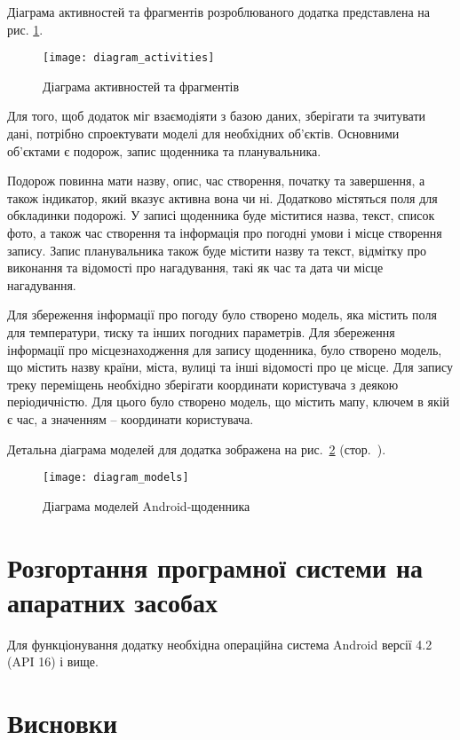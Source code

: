 \documentclass[../main.tex]{subfiles}
\begin{document}
Діаграма активностей та фрагментів розроблюваного додатка представлена на рис. \ref{diagram:activities}.

\begin{figure}[H]
	\centering
	\texttt{[image: diagram\_activities]}
	\caption{Діаграма активностей та фрагментів}
	\label{diagram:activities}
\end{figure}

Для того, щоб додаток міг взаємодіяти з базою даних, зберігати та зчитувати дані, потрібно спроектувати моделі для необхідних об'єктів. Основними об'єктами є подорож, запис щоденника та планувальника.

Подорож повинна мати назву, опис, час створення, початку та завершення, а також індикатор, який вказує активна вона чи ні. Додатково містяться поля для обкладинки подорожі. У записі щоденника буде міститися назва, текст, список фото, а також час створення та інформація про погодні умови і місце створення запису. Запис планувальника також буде містити назву та текст, відмітку про виконання та відомості про нагадування, такі як час та дата чи місце нагадування.

Для збереження інформації про погоду було створено модель, яка містить поля для температури, тиску та інших погодних параметрів. Для збереження інформації про місцезнаходження для запису щоденника, було створено модель, що містить назву країни, міста, вулиці та інші відомості про це місце. Для запису треку переміщень необхідно зберігати координати користувача з деякою періодичністю. Для цього було створено модель, що містить мапу, ключем в якій є час, а значенням -- координати користувача.

Детальна діаграма моделей для додатка зображена на рис.~\ref{diagram:models} (стор.~\pageref{diagram:models}).

\begin{figure}[pt] %
	\centering
	\texttt{[image: diagram\_models]}
	\caption{Діаграма моделей Android-щоденника}
	\label{diagram:models}
\end{figure}



\section{Розгортання програмної системи на апаратних засобах}

Для функціонування додатку необхідна операційна система Android версії 4.2 (API 16) і вище.


\section{Висновки}

\end{document}
